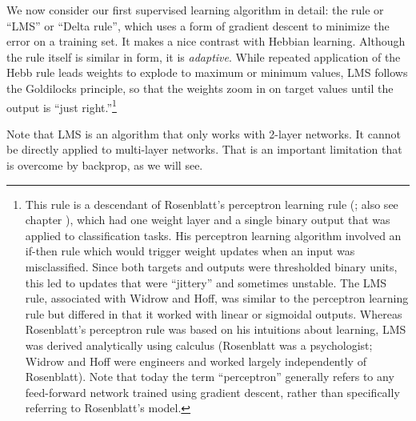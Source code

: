 We now consider our first supervised learning algorithm in detail: the  rule or ``LMS'' or ``Delta rule'', which uses a form of gradient descent to minimize the error on a training set. It makes a nice contrast with Hebbian learning. Although the rule itself is similar in form, it is \emph{adaptive}.  While repeated application of the Hebb rule leads weights to explode to maximum or minimum values, LMS follows the Goldilocks principle, so that the weights zoom in on target values until the output is ``just right.''\footnote{This rule is a descendant of Rosenblatt's perceptron learning rule (\cite{rosenblatt1960perceptron}; also see chapter ), which had one weight layer and a single binary output that was applied to classification tasks.  His perceptron learning algorithm involved an if-then rule which would trigger weight updates when an input was misclassified. Since both targets and outputs were thresholded binary units, this led to updates that were ``jittery'' and sometimes unstable. The LMS rule, associated with Widrow and Hoff, was similar to the perceptron learning rule but differed in that it worked with linear or sigmoidal outputs. Whereas Rosenblatt’s perceptron rule was based on his intuitions about learning, LMS was derived analytically using calculus (Rosenblatt was a psychologist; Widrow and Hoff were engineers and worked largely independently of Rosenblatt). Note that today the term ``perceptron'' generally refers to any feed-forward network trained using gradient descent, rather than specifically referring to Rosenblatt's model. }  

Note that LMS is an algorithm that only works with 2-layer networks. It cannot be directly applied to multi-layer networks. That is an important limitation that is overcome by backprop, as we will see.

